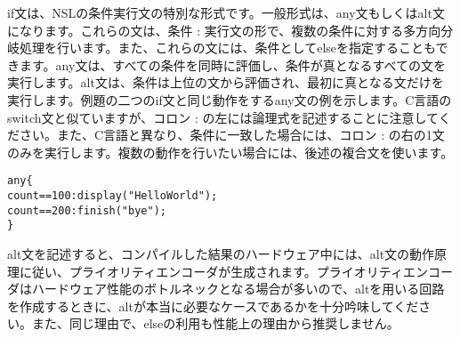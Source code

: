 if文は、NSLの条件実行文の特別な形式です。一般形式は、any文もしくはalt文になります。これらの文は、条件 : 実行文の形で、複数の条件に対する多方向分岐処理を行います。また、これらの文には、条件としてelseを指定することもできます。any文は、すべての条件を同時に評価し、条件が真となるすべての文を実行します。alt文は、条件は上位の文から評価され、最初に真となる文だけを実行します。例題の二つのif文と同じ動作をするany文の例を示します。C言語のswitch文と似ていますが、コロン : の左には論理式を記述することに注意してください。また、C言語と異なり、条件に一致した場合には、コロン : の右の1文のみを実行します。複数の動作を行いたい場合には、後述の複合文を使います。

\begin{reviewemlist}
\begin{alltt}
   any \{
       count==100: \textunderscore{}display("Hello World");
       count==200: \textunderscore{}finish("bye");
    \}
\end{alltt}
\end{reviewemlist}

alt文を記述すると、コンパイルした結果のハードウェア中には、alt文の動作原理に従い、プライオリティエンコーダが生成されます。プライオリティエンコーダはハードウェア性能のボトルネックとなる場合が多いので、altを用いる回路を作成するときに、altが本当に必要なケースであるかを十分吟味してください。また、同じ理由で、elseの利用も性能上の理由から推奨しません。
